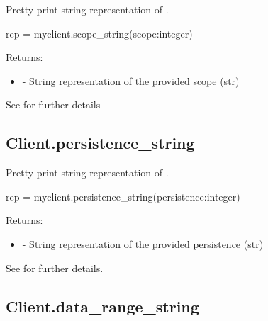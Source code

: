 \summary

Pretty-print string representation of .

\format

\pyspecificstart
\begin{codepar}
rep = myclient.scope_string(scope:integer)
\end{codepar}
\pyspecificend

\begin{arglist}
\end{arglist}

Returns:
\begin{itemize}
    \item {} - String representation of the provided scope (str)
\end{itemize}

See  for further details


\subsection{Client.persistence_string}

\summary

Pretty-print string representation of .

\format

\pyspecificstart
\begin{codepar}
rep = myclient.persistence_string(persistence:integer)
\end{codepar}
\pyspecificend

\begin{arglist}
\end{arglist}

Returns:
\begin{itemize}
    \item {} - String representation of the provided persistence (str)
\end{itemize}

See  for further details.


\subsection{Client.data_range_string}


